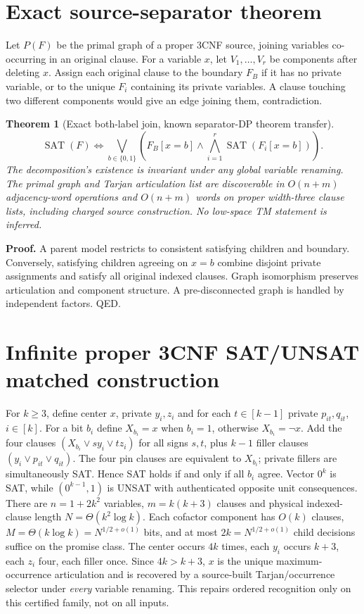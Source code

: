 \documentclass[11pt]{article}
\newtheorem{theorem}{Theorem}
\begin{document}
\section*{Exact source-separator theorem}
Let $P(F)$ be the primal graph of a proper 3CNF source, joining variables co-occurring in an original clause. For a variable $x$, let $V_1,\ldots,V_r$ be components after deleting $x$. Assign each original clause to the boundary $F_B$ if it has no private variable, or to the unique $F_i$ containing its private variables. A clause touching two different components would give an edge joining them, contradiction.
\begin{theorem}[Exact both-label join, known separator-DP theorem transfer]
\[
\operatorname{SAT}(F)\iff
\bigvee_{b\in\{0,1\}}\left(F_B[x=b]\wedge
\bigwedge_{i=1}^r\operatorname{SAT}(F_i[x=b])\right).
\]
The decomposition's existence is invariant under any global variable renaming. The primal graph and Tarjan articulation list are discoverable in $O(n+m)$ adjacency-word operations and $O(n+m)$ words on proper width-three clause lists, including charged source construction. No low-space TM statement is inferred.
\end{theorem}
\noindent\textbf{Proof.} A parent model restricts to consistent satisfying children and boundary. Conversely, satisfying children agreeing on $x=b$ combine disjoint private assignments and satisfy all original indexed clauses. Graph isomorphism preserves articulation and component structure. A pre-disconnected graph is handled by independent factors. QED.

\section*{Infinite proper 3CNF SAT/UNSAT matched construction}
For $k\ge3$, define center $x$, private $y_i,z_i$ and for each $t\in[k-1]$ private $p_{it},q_{it}$, $i\in[k]$. For a bit $b_i$ define $X_{b_i}=x$ when $b_i=1$, otherwise $X_{b_i}=\neg x$. Add the four clauses $(X_{b_i}\vee s y_i\vee t z_i)$ for all signs $s,t$, plus $k-1$ filler clauses $(y_i\vee p_{it}\vee q_{it})$. The four pin clauses are equivalent to $X_{b_i}$; private fillers are simultaneously SAT. Hence SAT holds if and only if all $b_i$ agree. Vector $0^k$ is SAT, while $(0^{k-1},1)$ is UNSAT with authenticated opposite unit consequences. There are $n=1+2k^2$ variables, $m=k(k+3)$ clauses and physical indexed-clause length $N=\Theta(k^2\log k)$. Each cofactor component has $O(k)$ clauses, $M=\Theta(k\log k)=N^{1/2+o(1)}$ bits, and at most $2k=N^{1/2+o(1)}$ child decisions suffice on the promise class.
The center occurs $4k$ times, each $y_i$ occurs $k+3$, each $z_i$ four, each filler once. Since $4k>k+3$, $x$ is the unique maximum-occurrence articulation and is recovered by a source-built Tarjan/occurrence selector under \emph{every} variable renaming. This repairs ordered recognition only on this certified family, not on all inputs.
\end{document}
